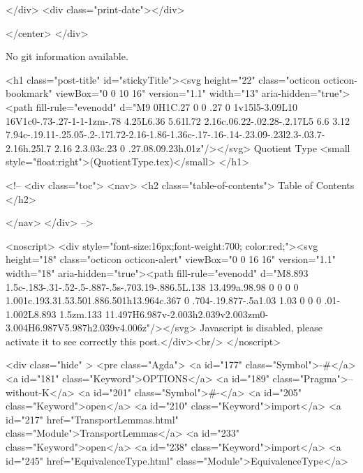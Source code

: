           
        </div>
        <div class="print-date"></div>
        
        
    </center>
  </div>

  
  No git information available.
  

  <h1 class="post-title" id="stickyTitle"><svg height="22" class="octicon octicon-bookmark" viewBox="0 0 10 16" version="1.1" width="13" aria-hidden="true"><path fill-rule="evenodd" d="M9 0H1C.27 0 0 .27 0 1v15l5-3.09L10 16V1c0-.73-.27-1-1-1zm-.78 4.25L6.36 5.61l.72 2.16c.06.22-.02.28-.2.17L5 6.6 3.12 7.94c-.19.11-.25.05-.2-.17l.72-2.16-1.86-1.36c-.17-.16-.14-.23.09-.23l2.3-.03.7-2.16h.25l.7 2.16 2.3.03c.23 0 .27.08.09.23h.01z"/></svg> Quotient Type <small style="float:right">(QuotientType.tex)</small>
  </h1>

  <!-- 
  <div class="toc">
    <nav>
    <h2 class="table-of-contents"> Table of Contents </h2>
      

    </nav>
  </div>
   -->

  <noscript>
  <div style="font-size:16px;font-weight:700; color:red;"><svg height="18" class="octicon octicon-alert" viewBox="0 0 16 16" version="1.1" width="18" aria-hidden="true"><path fill-rule="evenodd" d="M8.893 1.5c-.183-.31-.52-.5-.887-.5s-.703.19-.886.5L.138 13.499a.98.98 0 0 0 0 1.001c.193.31.53.501.886.501h13.964c.367 0 .704-.19.877-.5a1.03 1.03 0 0 0 .01-1.002L8.893 1.5zm.133 11.497H6.987v-2.003h2.039v2.003zm0-3.004H6.987V5.987h2.039v4.006z"/></svg> Javascript is disabled, please activate it to see correctly this post.</div><br/>
  </noscript>

  <div class="hide" >
<pre class="Agda">
<a id="177" class="Symbol">{-#</a> <a id="181" class="Keyword">OPTIONS</a> <a id="189" class="Pragma">--without-K</a> <a id="201" class="Symbol">#-}</a>
<a id="205" class="Keyword">open</a> <a id="210" class="Keyword">import</a> <a id="217" href="TransportLemmas.html" class="Module">TransportLemmas</a>
<a id="233" class="Keyword">open</a> <a id="238" class="Keyword">import</a> <a id="245" href="EquivalenceType.html" class="Module">EquivalenceType</a>


